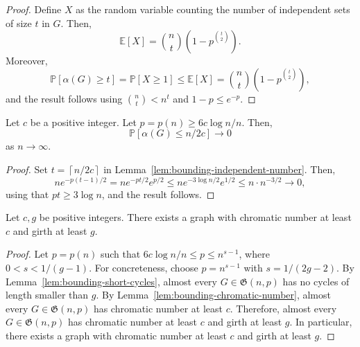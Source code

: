 \begin{proof}
    Define \(X\) as the random variable counting the number of independent sets of size \(t\) in \(G\).
    Then,
    \begin{equation}
        \mathbb{E}[X] = \binom{n}{t} \left(1-p^{\binom{t}{2}}\right).
    \end{equation}
    Moreover,
    \begin{equation}
        \mathbb{P}[\alpha(G) \geq t]
        = \mathbb{P}[X \geq 1]
        \leq \mathbb{E}[X]
        = \binom{n}{t} \left(1-p^{\binom{t}{2}}\right),
    \end{equation}
    and the result follows using \(\binom{n}{t} < n^t\) and \(1-p \leq e^{-p}\).
\end{proof}

\begin{lemma} \label{lem:bounding-chromatic-number}
    Let \(c\) be a positive integer.
    Let \(p = p(n) \geq 6c \log n / n\).
    Then, 
    \begin{equation}
        \mathbb{P}[\alpha(G) \leq n/2c] \to 0
    \end{equation}
    as \(n \to \infty\).
\end{lemma}

\begin{proof}
    Set \(t = \left\lceil n/2c \right\rceil\) in Lemma~\ref{lem:bounding-independent-number}.
    Then,
    \begin{equation}
        ne^{-p(t-1)/2}
        = ne^{-pt/2} e^{p/2}
        \leq ne^{-3\log n/2} e^{1/2}
        \leq n \cdot n^{-3/2} \to 0,
    \end{equation}
    using that \(pt \geq 3\log n\),
    and the result follows.
\end{proof}

\begin{theorem}[Erd\H{o}s, 1959]
    Let \(c, g\) be positive integers.
    There exists a graph with chromatic number at least \(c\) and girth at least \(g\).
\end{theorem}

\begin{proof}
    Let \(p = p(n)\) such that \(6c \log n / n \leq p \leq n^{s-1}\), where \(0 < s < 1/(g-1)\).
    For concreteness, choose \(p = n^{s-1}\) with \(s = 1/(2g - 2)\).
    By Lemma~\ref{lem:bounding-short-cycles}, almost every \(G \in \mathfrak{G}(n, p)\) has no cycles of length smaller than \(g\).
    By Lemma~\ref{lem:bounding-chromatic-number}, almost every \(G \in \mathfrak{G}(n, p)\) has chromatic number at least \(c\).
    Therefore, almost every \(G \in \mathfrak{G}(n, p)\) has chromatic number at least \(c\) and girth at least \(g\).
    In particular, there exists a graph with chromatic number at least \(c\) and girth at least \(g\).
\end{proof}

